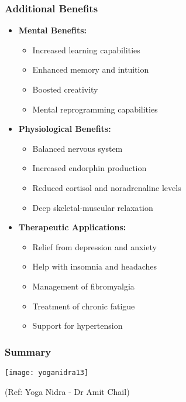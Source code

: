 \begin{frame}[fragile]\frametitle{Additional Benefits}
    \begin{itemize}
        \item \textbf{Mental Benefits:}
        \begin{itemize}
            \item Increased learning capabilities
            \item Enhanced memory and intuition
            \item Boosted creativity
            \item Mental reprogramming capabilities
        \end{itemize}
        \item \textbf{Physiological Benefits:}
        \begin{itemize}
            \item Balanced nervous system
            \item Increased endorphin production
            \item Reduced cortisol and noradrenaline levels
            \item Deep skeletal-muscular relaxation
        \end{itemize}
        \item \textbf{Therapeutic Applications:}
        \begin{itemize}
            \item Relief from depression and anxiety
            \item Help with insomnia and headaches
            \item Management of fibromyalgia
            \item Treatment of chronic fatigue
            \item Support for hypertension
        \end{itemize}
    \end{itemize}
\end{frame}

\begin{frame}[fragile]\frametitle{Summary}
      \begin{center}
        \texttt{[image: yoganidra13]}

		{\tiny (Ref: Yoga Nidra - Dr Amit Chail)}		
        \end{center}

\end{frame}


